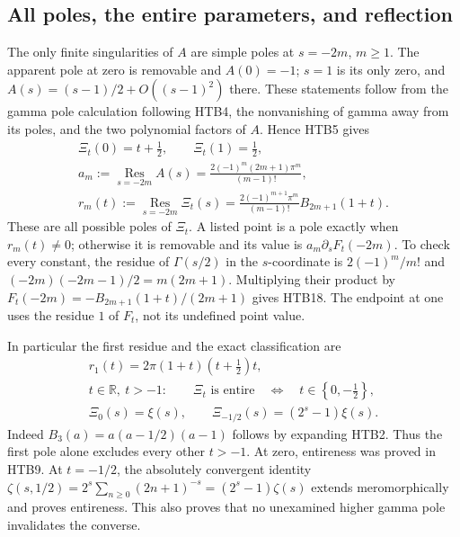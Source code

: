 \documentclass[11pt]{article}
\theoremstyle{definition}
\begin{document}
\subsection{All poles, the entire parameters, and reflection}

The only finite singularities of $A$ are simple poles at $s=-2m$,
$m\ge1$. The apparent pole at zero is removable and $A(0)=-1$;
$s=1$ is its only zero, and
$A(s)=(s-1)/2+O((s-1)^2)$ there. These statements follow from the
gamma pole calculation following HTB4, the nonvanishing of gamma
away from its poles, and the two polynomial factors of $A$. Hence
HTB5 gives
\begin{equation}\tag{HTB18}
\begin{gathered}
 \Xi_t(0)=t+\frac12,\qquad \Xi_t(1)=\frac12,\\
 a_m:=\operatorname*{Res}_{s=-2m}A(s)
   =\frac{2(-1)^m(2m+1)\pi^m}{(m-1)!},\\
 r_m(t):=\operatorname*{Res}_{s=-2m}\Xi_t(s)
   =\frac{2(-1)^{m+1}\pi^m}{(m-1)!}B_{2m+1}(1+t).
\end{gathered}
\end{equation}
These are all possible poles of $\Xi_t$. A listed point is a pole
exactly when $r_m(t)\ne0$; otherwise it is removable and its value is
$a_m\partial_sF_t(-2m)$. To check every constant, the residue of
$\Gamma(s/2)$ in the $s$-coordinate is $2(-1)^m/m!$ and
$(-2m)(-2m-1)/2=m(2m+1)$. Multiplying their product by
$F_t(-2m)=-B_{2m+1}(1+t)/(2m+1)$ gives HTB18. The endpoint at one
uses the residue $1$ of $F_t$, not its undefined point value.

In particular the first residue and the exact classification are
\begin{equation}\tag{HTB19}
\begin{gathered}
 r_1(t)=2\pi(1+t)\left(t+\frac12\right)t,\\
 t\in\mathbb R,\ t>-1:\qquad
 \Xi_t\text{ is entire}\quad\Longleftrightarrow\quad
 t\in\left\{0,-\frac12\right\},\\
 \Xi_0(s)=\xi(s),\qquad
 \Xi_{-1/2}(s)=(2^s-1)\xi(s).
\end{gathered}
\end{equation}
Indeed $B_3(a)=a(a-1/2)(a-1)$ follows by expanding HTB2. Thus the
first pole alone excludes every other $t>-1$. At zero, entireness was
proved in HTB9. At $t=-1/2$, the absolutely convergent identity
$\zeta(s,1/2)=2^s\sum_{n\ge0}(2n+1)^{-s}=(2^s-1)\zeta(s)$
extends meromorphically and proves entireness. This also proves that
no unexamined higher gamma pole invalidates the converse.
\end{document}
